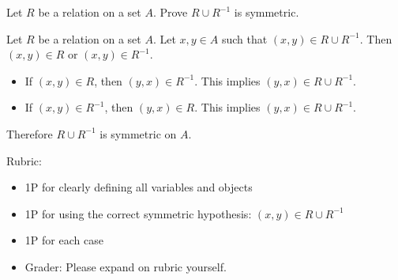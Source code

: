 \documentclass{article}
\theoremstyle{definition}
\begin{document}
\begin{question}{4}
    Let $R$ be a relation on a set $A$. Prove $R\cup R^{-1}$ is symmetric.
\end{question}
\begin{solution}
Let $R$ be a relation on a set $A$. Let $x, y \in A$ such that $(x, y) \in R\cup R^{-1}$. Then $(x, y)\in R$ or $(x, y)\in R^{-1}$.
	\begin{itemize}
		\item If $(x, y)\in R$, then $(y, x)\in R^{-1}$. This implies $(y, x)\in R\cup R^{-1}$. 
		\item If $(x, y)\in R^{-1}$, then $(y, x)\in R$. This implies $(y, x)\in R\cup R^{-1}$. 
	\end{itemize}
Therefore $R\cup R^{-1}$ is symmetric on $A$.

 {\color{red} Rubric:
\begin{itemize}
\item 1P for clearly defining all variables and objects
\item 1P for using the correct symmetric hypothesis: $(x, y) \in R\cup R^{-1}$
\item 1P for each case
\item Grader: Please expand on rubric yourself.
\end{itemize}}
\end{solution}
\end{document}
